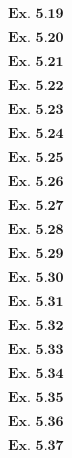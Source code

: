\documentclass{article}
\begin{document}
\vspace{0.2in}
${\textbf{Ex. 5.19}}$

\vspace{0.2in}
${\textbf{Ex. 5.20}}$

\vspace{0.2in}
${\textbf{Ex. 5.21}}$

\vspace{0.2in}
${\textbf{Ex. 5.22}}$

\vspace{0.2in}
${\textbf{Ex. 5.23}}$

\vspace{0.2in}
${\textbf{Ex. 5.24}}$

\vspace{0.2in}
${\textbf{Ex. 5.25}}$

\vspace{0.2in}
${\textbf{Ex. 5.26}}$

\vspace{0.2in}
${\textbf{Ex. 5.27}}$

\vspace{0.2in}
${\textbf{Ex. 5.28}}$

\vspace{0.2in}
${\textbf{Ex. 5.29}}$

\vspace{0.2in}
${\textbf{Ex. 5.30}}$

\vspace{0.2in}
${\textbf{Ex. 5.31}}$

\vspace{0.2in}
${\textbf{Ex. 5.32}}$

\vspace{0.2in}
${\textbf{Ex. 5.33}}$

\vspace{0.2in}
${\textbf{Ex. 5.34}}$

\vspace{0.2in}
${\textbf{Ex. 5.35}}$

\vspace{0.2in}
${\textbf{Ex. 5.36}}$

\vspace{0.2in}
${\textbf{Ex. 5.37}}$

\vspace{0.2in}
\end{document}
